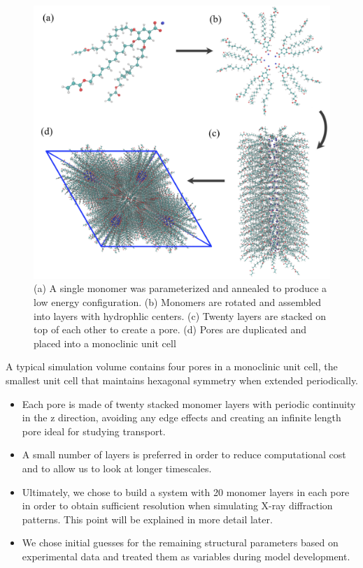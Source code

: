 \documentclass{article}
\begin{document}
  \begin{figure}[!ht]
	\centering
	\includegraphics[width=0.75\linewidth]{build.PNG} %
	\caption{(a) A single monomer was parameterized and annealed to produce a low energy
		configuration. (b) Monomers are rotated and assembled into layers with 
		hydrophlic centers. (c) Twenty layers are stacked on top of each other to create
		a pore. (d) Pores are duplicated and placed into a monoclinic unit cell}\label{fig:python}
  \end{figure}
  
  A typical simulation volume contains four pores in a monoclinic unit cell,
  the smallest unit cell that maintains hexagonal symmetry when extended 
  periodically.
  \begin{itemize}
    \item Each pore is made of twenty stacked monomer layers with periodic 
    continuity in the z direction, avoiding any edge effects and creating an 
    infinite length pore ideal for studying transport.
    \item A small number of layers is preferred in order to reduce computational
    cost and to allow us to look at longer timescales.
    \item Ultimately, we chose to build a system with 20 monomer layers in each pore
    in order to obtain sufficient resolution when simulating X-ray diffraction patterns.
    This point will be explained in more detail later.
    \item We chose initial guesses for the remaining structural parameters based on
    experimental data and treated them as variables during model development.
  \end{itemize}
  
\end{document}
